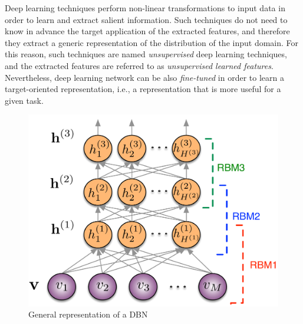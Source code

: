 Deep learning techniques perform non-linear transformations to input data in order to learn and extract salient information. Such techniques do not need to know in advance the target application of the extracted features, and therefore they extract a generic representation of the distribution of the input domain. For this reason, such techniques are named \textit{unsupervised} deep learning techniques, and the extracted features are referred to as \textit{unsupervised learned features}. Nevertheless, deep learning network can be also \textit{fine-tuned} in order to learn a target-oriented representation, i.e., a representation that is more useful for a given task.
 


\begin{figure}[tbp]
	\centering
	\includegraphics[width=.6\textwidth]{img/MSA/deep.pdf}
	\caption{General representation of a DBN}
	\label{fig:LLFs:DBN}
\end{figure} 


